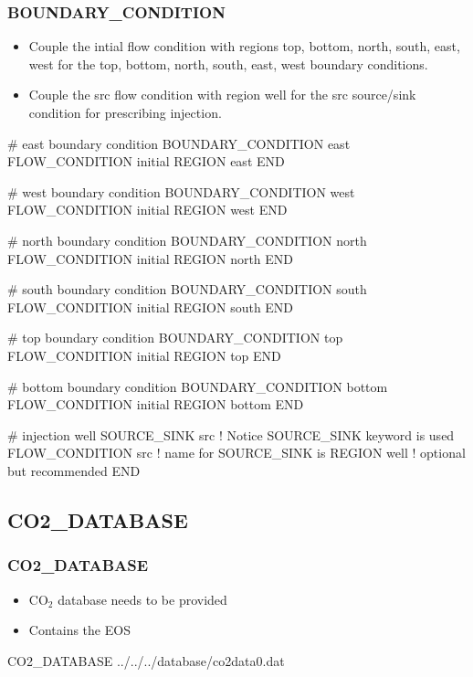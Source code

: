 \documentclass{beamer}
\def\co2{CO$_2$}
\newcommand\redcomment[1]{{{\color{red} #1}}}
\newcommand\bluecomment[1]{{{\color{blue} #1}}}
\newcommand\greencomment[1]{{{\color{green} #1}}}
\begin{document}
\begin{frame}\frametitle{BOUNDARY\_CONDITION}

\begin{itemize}
\item Couple the \greencomment{intial} flow condition with regions \greencomment{top, bottom, north, south, east, west} for the \redcomment{top, bottom, north, south, east, west} boundary conditions.
\item Couple the \greencomment{src} flow condition with region \greencomment{well} for the \redcomment{src} source/sink condition for prescribing injection.
\end{itemize}

\begin{semiverbatim}

# east boundary condition
BOUNDARY_CONDITION east
  FLOW_CONDITION initial 
  REGION east
END

# west boundary condition
BOUNDARY_CONDITION west
  FLOW_CONDITION initial 
  REGION west
END

# north boundary condition
BOUNDARY_CONDITION north
  FLOW_CONDITION initial 
  REGION north
END

# south boundary condition
BOUNDARY_CONDITION south
  FLOW_CONDITION initial 
  REGION south
END

# top boundary condition
BOUNDARY_CONDITION top
  FLOW_CONDITION initial 
  REGION top
END

# bottom boundary condition
BOUNDARY_CONDITION bottom
  FLOW_CONDITION initial 
  REGION bottom
END

# injection well
SOURCE_SINK src       \bluecomment{! Notice SOURCE_SINK keyword is used}
  FLOW_CONDITION src  \bluecomment{! name for SOURCE_SINK is }
  REGION well         \bluecomment{! optional but recommended}
END

\end{semiverbatim}

\end{frame}

\subsection{CO2\_DATABASE}

\begin{frame}[fragile]\frametitle{CO2\_DATABASE}

\begin{itemize}
\item \co2 database needs to be provided
\item Contains the EOS
\end{itemize}

\begin{semiverbatim}

CO2_DATABASE ../../../database/co2data0.dat

\end{semiverbatim}

\end{frame}
\end{document}
